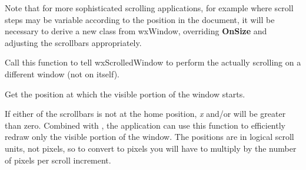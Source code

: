 Note that for more sophisticated scrolling applications, for example where
scroll steps may be variable according to the position in the document, it will be
necessary to derive a new class from wxWindow, overriding {\bf OnSize} and
adjusting the scrollbars appropriately.

\label{wxscrolledwindowsettargetwindow}


Call this function to tell wxScrolledWindow to perform the actually scrolling on
a different window (not on itself).

\label{wxscrolledwindowgetviewstart}


Get the position at which the visible portion of the window starts.





If either of the scrollbars is not at the home position, {\it x} and/or
 will be greater than zero.  Combined with ,
the application can use this function to efficiently redraw only the
visible portion of the window.  The positions are in logical scroll
units, not pixels, so to convert to pixels you will have to multiply
by the number of pixels per scroll increment.





